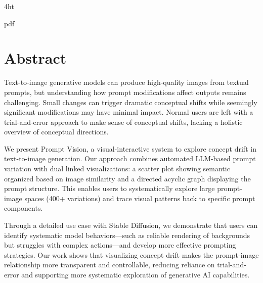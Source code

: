 \documentclass[
  a4paper,  %
  twoside,  %
  bibliography=totoc,
  headsepline,
  cleardoublepage=empty,
  parskip=half,
  draft=false
]{scrbook}
\begin{document}
\iftex4ht
  \Configure{$}{\PicMath}{\EndPicMath}{}

  {pdf}
  {%
  }
\fi



\Titelblatt

\pagestyle{preamble}
\renewcommand*{\chapterpagestyle}{preamble}



\section*{Abstract}

	Text-to-image generative models can produce high-quality images from textual prompts, but understanding how prompt modifications affect outputs remains challenging. Small changes can trigger dramatic conceptual shifts while seemingly significant modifications may have minimal impact. Normal users are left with a trial-and-error approach to make sense of conceptual shifts, lacking a holistic overview of conceptual directions. 
	
	We present Prompt Vision, a visual-interactive system to explore concept drift in text-to-image generation. Our approach combines automated LLM-based prompt variation with dual linked visualizations: a scatter plot showing semantic organized based on image similarity and a directed acyclic graph displaying the prompt structure. This enables users to systematically explore large prompt-image spaces (400+ variations) and trace visual patterns back to specific prompt components.
	
	Through a detailed use case with Stable Diffusion, we demonstrate that users can identify systematic model behaviors—such as reliable rendering of backgrounds but struggles with complex actions—and develop more effective prompting strategies. Our work shows that visualizing concept drift makes the prompt-image relationship more transparent and controllable, reducing reliance on trial-and-error and supporting more systematic exploration of generative AI capabilities.
\end{document}
